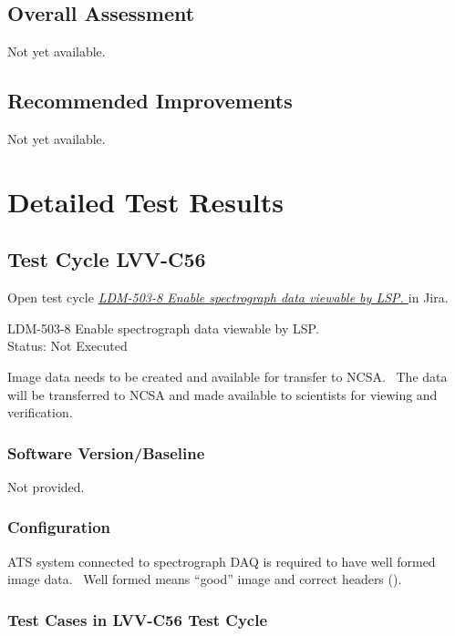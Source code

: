 \documentclass[DM,lsstdraft,STR,toc]{lsstdoc}
\begin{document}
\subsection{Overall Assessment}
\label{sect:overallassessment}

Not yet available.

\subsection{Recommended Improvements}
\label{sect:recommendations}

Not yet available.

\newpage
\section{Detailed Test Results}
\label{sect:detailedtestresults}


  \subsection{Test Cycle LVV-C56 }

Open test cycle {\it \href{https://jira.lsstcorp.org/secure/Tests.jspa#/testrun/LVV-C56}{LDM-503-8 Enable spectrograph data viewable by LSP.
}} in Jira.

  LDM-503-8 Enable spectrograph data viewable by LSP.
\\
  Status: Not Executed

  Image data needs to be created and available for transfer to NCSA. ~The
data will be transferred to NCSA and made available to scientists for
viewing and verification.~ ~~


  \subsubsection{Software Version/Baseline}
    Not provided.

  \subsubsection{Configuration}
    ATS system connected to spectrograph DAQ is required to have well formed
image data. ~Well formed means ``good'' image and correct headers
(). ~\\[2\baselineskip]


  \subsubsection{Test Cases in LVV-C56 Test Cycle}
\end{document}
